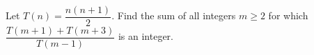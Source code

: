 Let $T(n)=\dfrac{n(n+1)}{2}$. Find the sum of all integers $m\ge2$ for which $\dfrac{T(m+1)+T(m+3)}{T(m-1)}$ is an integer.
